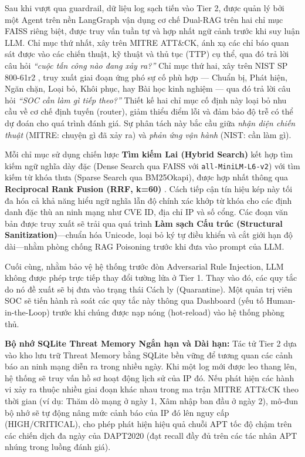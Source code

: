 \documentclass[12pt,a4paper]{article}
\begin{document}
Sau khi vượt qua guardrail, dữ liệu log sạch tiến vào Tier 2, được quản lý bởi một Agent trên nền LangGraph vận dụng cơ chế Dual-RAG trên hai chỉ mục FAISS riêng biệt, được truy vấn tuần tự và hợp nhất ngữ cảnh trước khi suy luận LLM. Chỉ mục thứ nhất, xây trên MITRE ATT\&CK, ánh xạ các chỉ báo quan sát được vào các chiến thuật, kỹ thuật và thủ tục (TTP) cụ thể, qua đó trả lời câu hỏi \textit{``cuộc tấn công nào đang xảy ra?''} Chỉ mục thứ hai, xây trên NIST SP 800-61r2 \cite{nist80061}, truy xuất giai đoạn ứng phó sự cố phù hợp --- Chuẩn bị, Phát hiện, Ngăn chặn, Loại bỏ, Khôi phục, hay Bài học kinh nghiệm --- qua đó trả lời câu hỏi \textit{``SOC cần làm gì tiếp theo?''}
Thiết kế hai chỉ mục cố định này loại bỏ nhu cầu về cơ chế định tuyến (router), giảm thiểu điểm lỗi và đảm bảo độ trễ có thể dự đoán cho quá trình đánh giá. Sự phân tách này bắc cầu giữa \textit{nhận diện chiến thuật} (MITRE: chuyện gì đã xảy ra) và \textit{phản ứng vận hành} (NIST: cần làm gì).

Mỗi chỉ mục sử dụng chiến lược \textbf{Tìm kiếm Lai (Hybrid Search)} kết hợp tìm kiếm ngữ nghĩa dày đặc (Dense Search qua FAISS với \verb|all-MiniLM-L6-v2|) với tìm kiếm từ khóa thưa (Sparse Search qua BM25Okapi), được hợp nhất thông qua \textbf{Reciprocal Rank Fusion (RRF, k=60)} \cite{rrf2009}. Cách tiếp cận tín hiệu kép này tối đa hóa cả khả năng hiểu ngữ nghĩa lẫn độ chính xác khớp từ khóa cho các định danh đặc thù an ninh mạng như CVE ID, địa chỉ IP và số cổng. Các đoạn văn bản được truy xuất sẽ trải qua quá trình \textbf{Làm sạch Cấu trúc (Structural Sanitization)}---chuẩn hóa Unicode, loại bỏ ký tự điều khiển và cắt giới hạn độ dài---nhằm phòng chống RAG Poisoning trước khi đưa vào prompt của LLM.

Cuối cùng, nhằm bảo vệ hệ thống trước đòn Adversarial Rule Injection, LLM không được phép trực tiếp thay đổi tường lửa ở Tier 1. Thay vào đó, các quy tắc do nó đề xuất sẽ bị đưa vào trạng thái Cách ly (Quarantine). Một quản trị viên SOC sẽ tiến hành rà soát các quy tắc này thông qua Dashboard (yếu tố Human-in-the-Loop) trước khi chúng được nạp nóng (hot-reload) vào hệ thống phòng thủ.

\textbf{Bộ nhớ SQLite Threat Memory Ngắn hạn và Dài hạn:} Tác tử Tier 2 dựa vào kho lưu trữ Threat Memory bằng SQLite bền vững để tương quan các cảnh báo an ninh mạng diễn ra trong nhiều ngày. Khi một log mới được leo thang lên, hệ thống sẽ truy vấn hồ sơ hoạt động lịch sử của IP đó. Nếu phát hiện các hành vi xảy ra thuộc nhiều giai đoạn khác nhau trong ma trận MITRE ATT\&CK theo thời gian (ví dụ: Thăm dò mạng ở ngày 1, Xâm nhập ban đầu ở ngày 2), mô-đun bộ nhớ sẽ tự động nâng mức cảnh báo của IP đó lên nguy cấp (HIGH/CRITICAL), cho phép phát hiện hiệu quả chuỗi APT tốc độ chậm trên các chiến dịch đa ngày của DAPT2020 (đạt recall đầy đủ trên các tác nhân APT nhúng trong luồng đánh giá).
\end{document}
